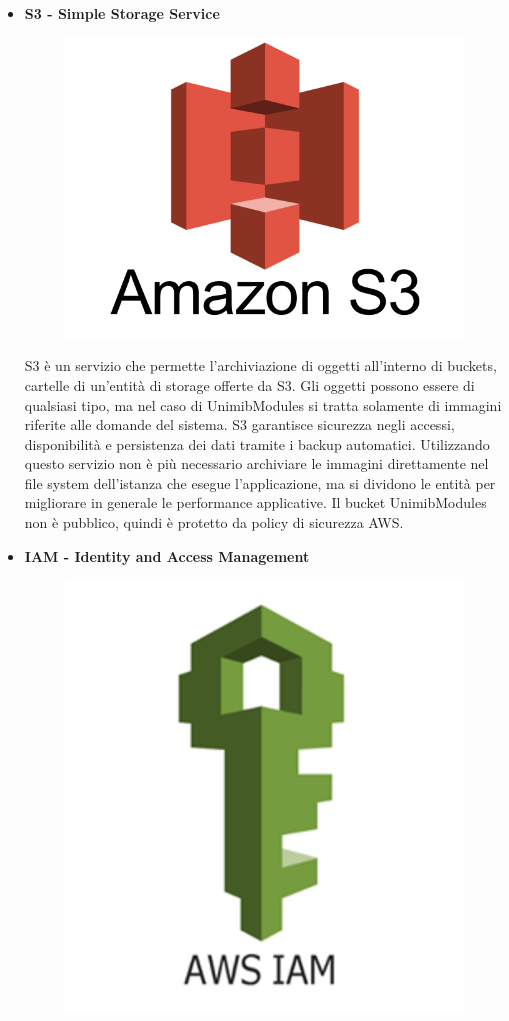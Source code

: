 \documentclass[12pt]{article}
\begin{document}
\begin{itemize}
\item \textbf{S3 - Simple Storage Service}
\begin{figure}[H]
\includegraphics[scale=0.2, left]{s3.png}
\end{figure}
S3 è un servizio che permette l'archiviazione di oggetti all'interno di buckets, cartelle di un'entità di storage offerte da S3. Gli oggetti possono essere di qualsiasi tipo, ma nel caso di UnimibModules si tratta solamente di immagini riferite alle domande del sistema. S3 garantisce sicurezza negli accessi, disponibilità e persistenza dei dati tramite i backup automatici. Utilizzando questo servizio non è più necessario archiviare le immagini direttamente nel file system dell'istanza che esegue l'applicazione, ma si dividono le entità per migliorare in generale le performance applicative. Il bucket UnimibModules non è pubblico, quindi è protetto da policy di sicurezza AWS.
\item \textbf{IAM - Identity and Access Management}
\begin{figure}[H]
\includegraphics[scale=0.2, left]{iam.png}

\end{figure}
\end{itemize}
\end{document}
